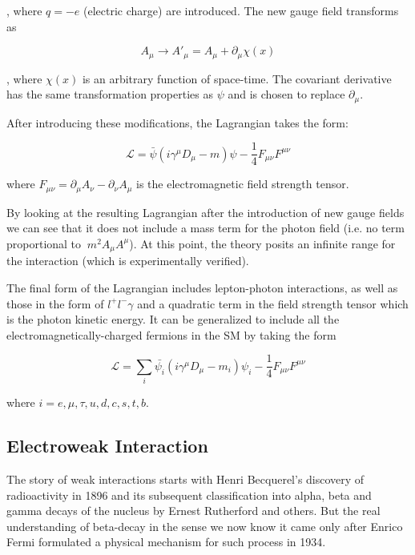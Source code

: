 , where $q = -e$ (electric charge) are introduced. The new gauge field transforms as

\begin{equation}
A_{\mu}\rightarrow A'_{\mu} = A_{\mu} + \partial_{\mu}\chi(x)
\end{equation}

, where $\chi(x)$ is an arbitrary function of space-time. The covariant derivative has the same transformation properties as $\psi$ and is chosen to replace $\partial_{\mu}$.

After introducing these modifications, the Lagrangian takes the form:

\begin{equation}
\mathcal{L} = \bar{\psi}(i\gamma^{\mu}D_{\mu}-m)\psi - \frac{1}{4}F_{\mu\nu}F^{\mu\nu}
\end{equation}

where $F_{\mu\nu}= \partial_{\mu}A_{\nu} - \partial_{\nu}A_{\mu}$ is the electromagnetic field strength tensor. 

By looking at the resulting Lagrangian after the introduction of new gauge fields we can see that it does not include a mass term for the photon field (i.e. no term proportional to $~m^{2}A_{\mu}A^{\mu}$). At this point, the theory posits an infinite range for the interaction (which is experimentally verified).

The final form of the Lagrangian includes lepton-photon interactions, as well as those in the form of $l^{+}l^{-}\gamma$ and a quadratic term in the field strength tensor which is the photon kinetic energy. It can be generalized to include all the electromagnetically-charged fermions in the SM by taking the form

\begin{equation}
\mathcal{L} = \sum_{i}\bar{\psi_{i}}(i\gamma^{\mu}D_{\mu}-m_{i})\psi_{i} - \frac{1}{4}F_{\mu\nu}F^{\mu\nu}
\end{equation}

where $i=e,\mu,\tau,u,d,c,s,t,b$.

\subsection{Electroweak Interaction}

The story of weak interactions starts with Henri Becquerel's discovery of radioactivity in 1896 and its subsequent classification into alpha, beta and gamma decays of the nucleus by Ernest Rutherford and others. But the real understanding of beta-decay in the sense we now know it came only after Enrico Fermi formulated a physical mechanism for such process in 1934.


